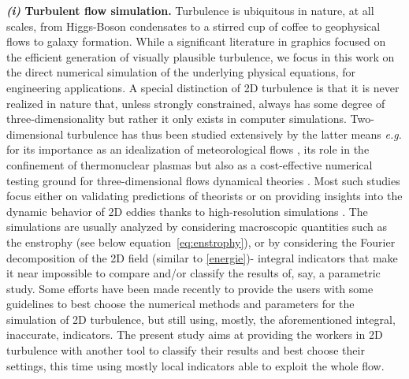 \noindent
\textbf{\emph{(i)} Turbulent flow simulation.}
Turbulence is ubiquitous in nature, at all scales, from Higgs-Boson condensates \cite{Kraichnan1967} to a stirred cup of coffee to geophysical flows \cite{Kraichnan1980} to galaxy formation.
While a significant literature in graphics \cite{KimTJG08, ZhangLSSQ14, BaiWDL21} focused on the efficient generation of visually plausible turbulence, we focus in this work on the direct numerical simulation of the underlying physical equations, for engineering applications.
A special distinction of 2D turbulence is that it is never realized in nature that, unless strongly constrained,
always has some degree of three-dimensionality but rather it only exists in computer simulations.
Two-dimensional turbulence has thus been studied extensively by the latter means \emph{e.g.} for its importance as an idealization of meteorological flows \cite{Boffetta2011}, its role in the confinement of thermonuclear plasmas \cite{Kraichnan1980} but also as a cost-effective numerical testing ground for three-dimensional flows dynamical theories \cite{Tabeling2002}.
Most such studies focus either on validating predictions of theorists \cite{Kraichnan1967,lilly1989two} or on providing insights into the dynamic behavior of 2D eddies thanks to high-resolution simulations \cite{lilly1989two,Maltrud1991}.
The simulations are usually analyzed by considering macroscopic quantities such as the enstrophy (see below equation~\eqref{eq:enstrophy}), or by considering the Fourier decomposition of the 2D field (similar to \autoref{energie})- integral indicators that make it near impossible to compare and/or classify the results of, say, a parametric study.
Some efforts have been made recently \cite{san2015evaluation} to provide the users with some guidelines to best choose the numerical methods and parameters for the simulation of 2D turbulence, but still using, mostly, the aforementioned integral, inaccurate, indicators.
The present study aims at providing the workers in 2D turbulence with another tool to classify their results and best choose their settings, this time using mostly local indicators able to exploit the whole flow.

